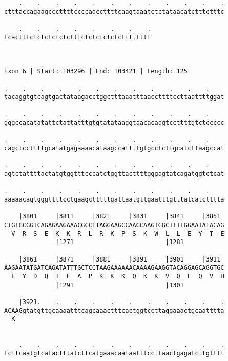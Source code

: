\documentclass{article}
\begin{document}
\begin{Verbatim}
    .    .    .    .    .    .    .    .    .    .    .    .
ctttaccagaagcccttttccccaaccttttcaagtaaatctctataacatctttctttc
                                                            
    .    .    .    .    .    .    .    .
tcactttctctctctctctttctctctctctctttttttt
                                        
                                        
 
Exon 6 | Start: 103296 | End: 103421 | Length: 125
 
.    .    .    .    .    .    .    .    .    .    .    .    
tacaggtgtcagtgactataagacctggctttaaatttaaccttttccttaattttggat
                                                            
.    .    .    .    .    .    .    .    .    .    .    .    
gggccacatatattctattatttgtgtatataaggtaacacaagtccttttgtctccccc
                                                            
.    .    .    .    .    .    .    .    .    .    .    .    
cagctccttttgcatatgagaaaacataagccattttgtgcctcttgcatcttaagccat
                                                            
.    .    .    .    .    .    .    .    .    .    .    .    
agtctattttactatgtggtttcccatctggttacttttgggagtatcagatggtctcat
                                                            
.    .    .    .    .    .    .    .    .    .    .    .    
aaaaacagtgggttttcctgaagctttttgattaatgttgaatttgtttatcatctttta
                                                            
    |3801     |3811     |3821     |3831     |3841     |3851 
CTGTGCGGTCAGAGAAGAAACGCCTTAGGAAGCCAAGCAAGTGGCTTTTGGAATATACAG
  V  R  S  E  K  K  R  L  R  K  P  S  K  W  L  L  E  Y  T  E
              |1271                         |1281           
  
    |3861     |3871     |3881     |3891     |3901     |3911 
AAGAATATGATCAGATATTTGCTCCTAAGAAAAAACAAAAGAAGGTACAGGAGCAGGTGC
  E  Y  D  Q  I  F  A  P  K  K  K  Q  K  K  V  Q  E  Q  V  H
              |1291                         |1301           
  
    |3921.    .    .    .    .    .    .    .    .    .    .
ACAAGgtatgttgcaaaatttcagcaaactttcactggtccttaggaaactgcaatttta
  K                                                         
                                                            
  
    .    .    .    .    .    .    .    .    .    .    .    .
tcttcaatgtcatactttatcttcatgaaacaataatttccttaactgagatcttgtttt
                                                            

\end{Verbatim}
\end{document}
